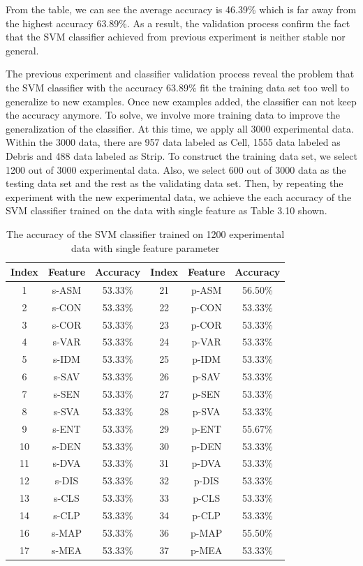 From the table, we can see the average accuracy is 46.39\% which is far away from the highest accuracy 63.89\%. As a result, the validation process confirm the fact that the SVM classifier achieved from previous experiment is neither stable nor general. \par
The previous experiment and classifier validation process reveal the problem that the SVM classifier with the accuracy 63.89\% fit the training data set too well to generalize to new examples. Once new examples added, the classifier can not keep the accuracy anymore. To solve, we involve more training data to improve the generalization of the classifier. At this time, we apply all 3000 experimental data. Within the 3000 data, there are 957 data labeled as Cell, 1555 data labeled as Debris and 488 data labeled as Strip. To construct the training data set, we select 1200 out of 3000 experimental data. Also, we select 600 out of 3000 data as the testing data set and the rest as the validating data set. Then, by repeating the experiment with the new experimental data, we achieve the each accuracy of the SVM classifier trained on the data with single feature as Table 3.10 shown. 
\begin{table}[!h]
\begin{center}
\renewcommand{\arraystretch}{0.5}
\begin{tabular}{||c c c c c c ||}
\hline
Index & Feature & Accuracy & Index & Feature & Accuracy \\[0.7ex]
\hline\hline
1 & s-ASM & 53.33\% & 21 & p-ASM & 56.50\% \\
2 & s-CON & 53.33\% & 22 & p-CON & 53.33\% \\
3 & s-COR & 53.33\% & 23 & p-COR & 53.33\% \\
4 & s-VAR & 53.33\% & 24 & p-VAR & 53.33\% \\
5 & s-IDM & 53.33\% & 25 & p-IDM & 53.33\% \\
6 & s-SAV & 53.33\% & 26 & p-SAV & 53.33\% \\
7 & s-SEN & 53.33\% & 27 & p-SEN & 53.33\% \\
8 & s-SVA & 53.33\% & 28 & p-SVA & 53.33\% \\
9 & s-ENT & 53.33\% & 29 & p-ENT & 55.67\% \\
10 & s-DEN & 53.33\% & 30 & p-DEN & 53.33\% \\
11 & s-DVA & 53.33\% & 31 & p-DVA & 53.33\% \\
12 & s-DIS & 53.33\% & 32 & p-DIS & 53.33\% \\
13 & s-CLS & 53.33\% & 33 & p-CLS & 53.33\% \\
14 & s-CLP & 53.33\% & 34 & p-CLP & 53.33\% \\
16 & s-MAP & 53.33\% & 36 & p-MAP & 55.50\% \\
17 & s-MEA & 53.33\% & 37 & p-MEA & 53.33\% \\
\hline
\end{tabular}
\caption {The accuracy of the SVM classifier trained on 1200 experimental data with single feature parameter}
\end{center}
\end{table}
